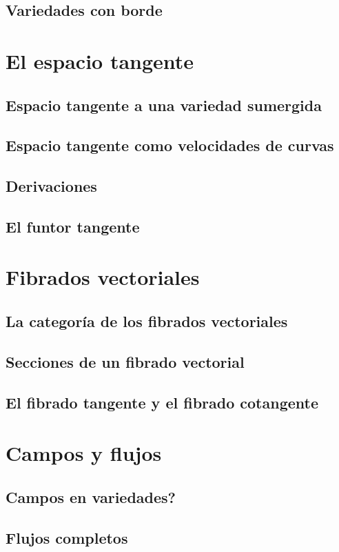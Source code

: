\documentclass[12pt,a4paper]{book}
\theoremstyle{definition} \newtheorem{defn}[thm]{Definición}
\theoremstyle{definition} \newtheorem{ejemplo}[thm]{Ejemplo}
\theoremstyle{definition} \newtheorem{ejercicio}[thm]{Ejercicio}
\theoremstyle{remark} \newtheorem*{obs}{Observación}
\begin{document}
	  \section{Variedades con borde}
	  \chapter{El espacio tangente}
	  \section{Espacio tangente a una variedad sumergida}
	  \section{Espacio tangente como velocidades de curvas}
	  \section{Derivaciones}
	  \section{El funtor tangente}
	  \chapter{Fibrados vectoriales}
	  \section{La categoría de los fibrados vectoriales}
	  \section{Secciones de un fibrado vectorial}
	  \section{El fibrado tangente y el fibrado cotangente}
	  \chapter{Campos y flujos}
	  \section{Campos en variedades?}
	  \section{Flujos completos}
\end{document}
